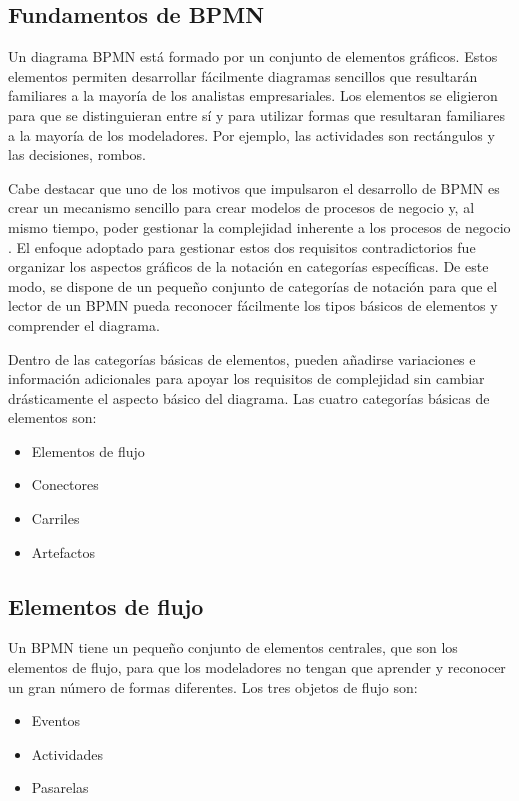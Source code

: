 \subsection{Fundamentos de BPMN}

Un diagrama BPMN está formado por un conjunto de elementos gráficos.
Estos elementos permiten desarrollar fácilmente diagramas sencillos que resultarán familiares a la mayoría de los analistas empresariales.
Los elementos se eligieron para que se distinguieran entre sí y para utilizar formas que resultaran familiares a la mayoría de los modeladores.
Por ejemplo, las actividades son rectángulos y las decisiones, rombos.

Cabe destacar que uno de los motivos que impulsaron el desarrollo de BPMN es crear un mecanismo sencillo para crear modelos de procesos de negocio y, al mismo tiempo, poder gestionar la complejidad inherente a los procesos de negocio \cite{white_introduction_2004}.
El enfoque adoptado para gestionar estos dos requisitos contradictorios fue organizar los aspectos gráficos de la notación en categorías específicas.
De este modo, se dispone de un pequeño conjunto de categorías de notación para que el lector de un BPMN pueda reconocer fácilmente los tipos básicos de elementos y comprender el diagrama.

Dentro de las categorías básicas de elementos, pueden añadirse variaciones e información adicionales para apoyar los requisitos de complejidad sin cambiar drásticamente el aspecto básico del diagrama.
Las cuatro categorías básicas de elementos son:

\begin{itemize}
    \item Elementos de flujo
    \item Conectores
    \item Carriles
    \item Artefactos
\end{itemize}

\subsection{Elementos de flujo}

Un BPMN tiene un pequeño conjunto de  elementos centrales, que son los elementos de flujo, para que los modeladores no tengan que aprender y reconocer un gran número de formas diferentes.
Los tres objetos de flujo son:

\begin{itemize}
    \item Eventos
    \item Actividades
    \item Pasarelas
\end{itemize}

